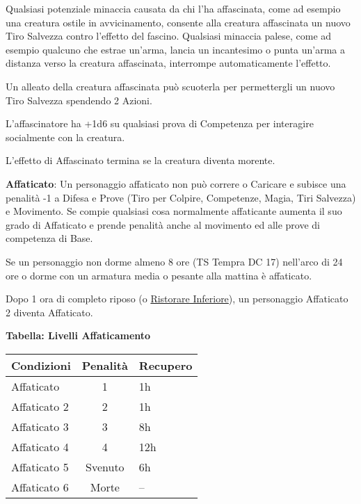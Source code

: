 \begin{multicols}{2}
Qualsiasi potenziale minaccia causata da chi l'ha affascinata, come ad esempio una creatura ostile in avvicinamento, consente alla creatura affascinata un nuovo Tiro Salvezza contro l'effetto del fascino. Qualsiasi minaccia palese, come ad esempio qualcuno che estrae un'arma, lancia un incantesimo o punta un'arma a distanza verso la creatura affascinata, interrompe automaticamente l'effetto.

Un alleato della creatura affascinata può scuoterla per permettergli un nuovo Tiro Salvezza spendendo 2 Azioni.

L'affascinatore ha +1d6 su qualsiasi prova di Competenza per interagire socialmente con la creatura.

L'effetto di Affascinato termina se la creatura diventa morente.

\textbf{Affaticato}\hypertarget{affaticato}{}\label{affaticato}: Un personaggio affaticato non può correre o Caricare e subisce una penalità -1 a Difesa e Prove (Tiro per Colpire, Competenze, Magia, Tiri Salvezza) e Movimento. Se compie qualsiasi cosa normalmente affaticante aumenta il suo grado di Affaticato e prende penalità anche al movimento ed alle prove di competenza di Base.

Se un personaggio non dorme almeno 8 ore (TS Tempra DC 17) nell'arco di 24 ore o dorme con un armatura media o pesante alla mattina è affaticato.

Dopo 1 ora di completo riposo (o \hyperlink{Ristorare Inferiore}{Ristorare Inferiore}), un personaggio Affaticato 2 diventa Affaticato.

\medskip

\textbf{Tabella: Livelli Affaticamento}

\medskip

\noindent\begin{tabularx}{\linewidth}{lcl}
	\toprule
\rowcolor{gray!20}\textbf{Condizioni}& \textbf{Penalità}&\textbf{Recupero}\\
\toprule
Affaticato 		&	1 		&	1h\\
\rowcolor{gray!20}Affaticato 2	&	2		&	1h\\
Affaticato 3	&	3		&	8h\\
\rowcolor{gray!20}Affaticato 4	&	4		&	12h\\
Affaticato 5	&	Svenuto	&	6h\\
\rowcolor{gray!20}Affaticato 6	&	Morte	&	--
\end{tabularx}


\end{multicols}
